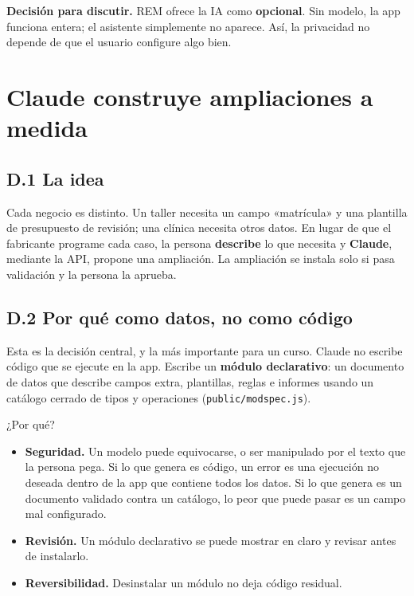 \textbf{Decisión para discutir.} REM ofrece la IA como \textbf{opcional}. Sin modelo, la app funciona entera; el asistente simplemente no aparece. Así, la privacidad no depende de que el usuario configure algo bien.

\chapter{Claude construye ampliaciones a medida}\label{cap:modulos}\label{claude-construye-ampliaciones-a-medida}

\section{D.1 La idea}\label{d.1-la-idea}

Cada negocio es distinto. Un taller necesita un campo «matrícula» y una plantilla de presupuesto de revisión; una clínica necesita otros datos. En lugar de que el fabricante programe cada caso, la persona \textbf{describe} lo que necesita y \textbf{Claude}, mediante la API, propone una ampliación. La ampliación se instala solo si pasa validación y la persona la aprueba.

\section{D.2 Por qué como datos, no como código}\label{d.2-por-quuxe9-como-datos-no-como-cuxf3digo}

Esta es la decisión central, y la más importante para un curso. Claude no escribe código que se ejecute en la app. Escribe un \textbf{módulo declarativo}: un documento de datos que describe campos extra, plantillas, reglas e informes usando un catálogo cerrado de tipos y operaciones (\texttt{public/modspec.js}).

¿Por qué?

\begin{itemize}
\tightlist
\item
  \textbf{Seguridad.} Un modelo puede equivocarse, o ser manipulado por el texto que la persona pega. Si lo que genera es código, un error es una ejecución no deseada dentro de la app que contiene todos los datos. Si lo que genera es un documento validado contra un catálogo, lo peor que puede pasar es un campo mal configurado.
\item
  \textbf{Revisión.} Un módulo declarativo se puede mostrar en claro y revisar antes de instalarlo.
\item
  \textbf{Reversibilidad.} Desinstalar un módulo no deja código residual.
\end{itemize}

